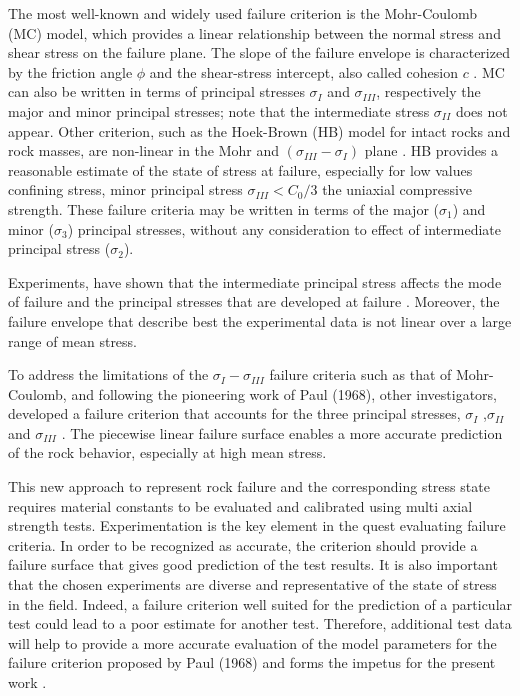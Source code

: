 The most well-known and widely used failure criterion is the Mohr-Coulomb (MC) model, which provides a linear relationship between the normal stress and shear stress on the failure plane. The slope of the failure envelope is characterized by the friction angle $\phi$ and the shear-stress intercept, also called cohesion $c$ \cite{Jaeger1979}. MC can also be written in terms of principal stresses $\sigma_I$ and $\sigma_{III}$, respectively the major and minor principal stresses; note that the intermediate stress $\sigma_{II}$ does not appear. Other criterion, such as the Hoek-Brown (HB) model for intact rocks and rock masses, are non-linear in the Mohr and $(\sigma_{III}-\sigma_{I})$ plane \cite{Hoek1980}. HB provides a reasonable estimate of the state of stress at failure, especially for low values confining stress, minor principal stress $\sigma_{III} < C_0/3$ the uniaxial compressive strength. These failure criteria may be written in terms of the major ($\sigma_1$) and minor ($\sigma_3$) principal stresses, without any consideration to effect of intermediate principal stress ($\sigma_2$).

Experiments, have shown that the intermediate principal stress affects the mode of failure and the principal stresses that are developed at failure \cite{Labuz2018,Labuz1996, Zeng2019,Makhnenko2013}. Moreover, the failure envelope that describe best the experimental data is not linear over a large range of mean stress. 

To address the limitations of the $\sigma_I-\sigma_{III}$ failure criteria such as that of Mohr-Coulomb, and following the pioneering work of Paul (1968), other investigators, developed a failure criterion that accounts for the three principal stresses, $\sigma_I$ ,$\sigma_{II}$ and $\sigma_{III}$ \cite{Paul1968,Meyer2013}. The piecewise linear failure surface enables a more accurate prediction of the rock behavior, especially at high mean stress. 

This new approach to represent rock failure and the corresponding stress state requires material constants to be evaluated and calibrated using multi axial strength tests. Experimentation is the key element in the quest evaluating failure criteria. In order to be recognized as accurate, the criterion should provide a failure surface that gives good prediction of the test results. It is also important that the chosen experiments are diverse and representative of the state of stress in the field. Indeed, a failure criterion well suited for the prediction of a particular test could lead to a poor estimate for another test. Therefore, additional test data will help to provide a more accurate evaluation of the model parameters for the failure criterion proposed by Paul (1968) and forms the impetus for the present work \cite{Paul1968}.

